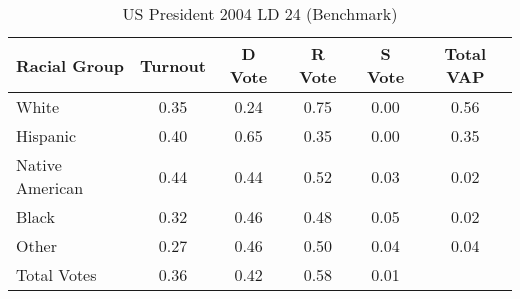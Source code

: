 \begin{table}[htb]
\begin{center}
\caption{US President 2004 LD 24 (Benchmark)}
\label{pres04_vap_ld_24_benchmark}
\begin{tabular}{lccccc}
  \hline
Racial Group & Turnout & D Vote & R Vote & S Vote & Total VAP \\ 
  \hline
White & 0.35 & 0.24 & 0.75 & 0.00 & 0.56 \\ 
  Hispanic & 0.40 & 0.65 & 0.35 & 0.00 & 0.35 \\ 
  Native American & 0.44 & 0.44 & 0.52 & 0.03 & 0.02 \\ 
  Black & 0.32 & 0.46 & 0.48 & 0.05 & 0.02 \\ 
  Other & 0.27 & 0.46 & 0.50 & 0.04 & 0.04 \\ 
  Total Votes & 0.36 & 0.42 & 0.58 & 0.01 &  \\ 
   \hline
\end{tabular}
\end{center}
\end{table}
